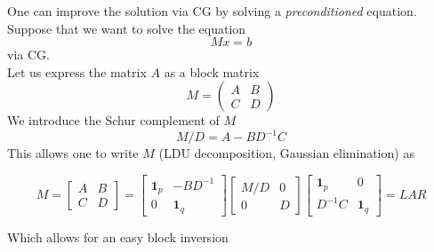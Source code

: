 One can improve the solution via CG by solving a \emph{preconditioned} equation. Suppose that we want to solve the equation
\begin{equation*}
    M x = b
\end{equation*}
via CG. \\
Let us express the matrix $A$ as a block matrix
\begin{equation}
    M = \begin{pmatrix*}
        A & B \\ C & D
    \end{pmatrix*}
    \label{eq:block_matrix}
\end{equation}
We introduce the Schur complement of $M$
\begin{equation}
    M/D = A - B D^{-1} C
    \label{eq:schur_complement}
\end{equation}
This allows one to write $M$ (LDU decomposition, Gaussian elimination) as 

\begin{equation*}
M=\left[\begin{array}{ll}
A & B \\
C & D
\end{array}\right]=\left[\begin{array}{cc}
\mathbf{1}_p & -B D^{-1} \\
0 & \mathbf{1}_q
\end{array}\right]\left[\begin{array}{cc}
M / D & 0 \\
0 & D
\end{array}\right]\left[\begin{array}{cc}
\mathbf{1}_p & 0 \\
D^{-1} C & \mathbf{1}_q
\end{array}\right] = L A R
\end{equation*}

Which allows for an easy block inversion

